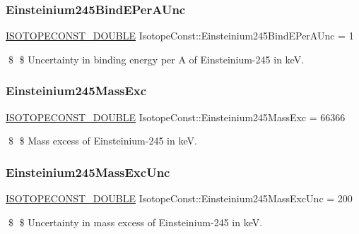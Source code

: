 \subsubsection{\texorpdfstring{Einsteinium245\+Bind\+E\+Per\+A\+Unc}{Einsteinium245BindEPerAUnc}}
{\footnotesize\ttfamily \mbox{\hyperlink{group___isotope_const-_macros_ga8f45a7272ce02c0b4c65c44636ed719a}{I\+S\+O\+T\+O\+P\+E\+C\+O\+N\+S\+T\+\_\+\+D\+O\+U\+B\+LE}} Isotope\+Const\+::\+Einsteinium245\+Bind\+E\+Per\+A\+Unc = 1}

\$ \$ Uncertainty in binding energy per A of Einsteinium-\/245 in keV. \mbox{\label{group___isotope_const-_einsteinium-_es245_ga3aff6b0aadb1e0ab45c20cddd40601df}} 
\subsubsection{\texorpdfstring{Einsteinium245\+Mass\+Exc}{Einsteinium245MassExc}}
{\footnotesize\ttfamily \mbox{\hyperlink{group___isotope_const-_macros_ga8f45a7272ce02c0b4c65c44636ed719a}{I\+S\+O\+T\+O\+P\+E\+C\+O\+N\+S\+T\+\_\+\+D\+O\+U\+B\+LE}} Isotope\+Const\+::\+Einsteinium245\+Mass\+Exc = 66366}

\$ \$ Mass excess of Einsteinium-\/245 in keV. \mbox{\label{group___isotope_const-_einsteinium-_es245_ga54861acc78945a7e8504f09bc0f92c77}} 
\subsubsection{\texorpdfstring{Einsteinium245\+Mass\+Exc\+Unc}{Einsteinium245MassExcUnc}}
{\footnotesize\ttfamily \mbox{\hyperlink{group___isotope_const-_macros_ga8f45a7272ce02c0b4c65c44636ed719a}{I\+S\+O\+T\+O\+P\+E\+C\+O\+N\+S\+T\+\_\+\+D\+O\+U\+B\+LE}} Isotope\+Const\+::\+Einsteinium245\+Mass\+Exc\+Unc = 200}

\$ \$ Uncertainty in mass excess of Einsteinium-\/245 in keV. \mbox{\label{group___isotope_const-_einsteinium-_es245_ga57cb3388dbe4ba2abbd0a720b427471f}} 
